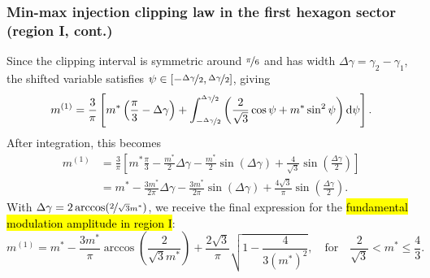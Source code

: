 \begin{frame}
    \frametitle{Min-max injection clipping law in the first hexagon sector (region I, cont.)}
    Since the clipping interval is symmetric around $\nicefrac{\pi}{6}$ and has width $\Delta\gamma = \gamma_2-\gamma_1$, the shifted variable satisfies $\psi \in [-\nicefrac{\Delta\gamma}{2},\nicefrac{\Delta\gamma}{2}]$, giving
    \begin{equation}
        m^{(1)} = \frac{3}{\pi}\left[m^*\left(\frac{\pi}{3}-\Delta\gamma\right) + \int_{-\nicefrac{\Delta\gamma}{2}}^{\nicefrac{\Delta\gamma}{2}}\left(\frac{2}{\sqrt{3}}\cos\psi + m^*\sin^2\psi\right)\mathrm{d}\psi\right].
    \end{equation}\pause
    After integration, this becomes
    \begin{equation}
        \begin{split}
            m^{(1)} & = \frac{3}{\pi}\left[m^*\frac{\pi}{3} - \frac{m^*}{2}\Delta\gamma - \frac{m^*}{2}\sin\!\left(\Delta\gamma\right) + \frac{4}{\sqrt{3}}\sin\!\left(\frac{\Delta\gamma}{2}\right)\right] \\
                    & = m^* - \frac{3m^*}{2\pi}\Delta\gamma - \frac{3m^*}{2\pi}\sin\!\left(\Delta\gamma\right) + \frac{4\sqrt{3}}{\pi}\sin\!\left(\frac{\Delta\gamma}{2}\right).
        \end{split}
    \end{equation}\pause
    With $\Delta\gamma = 2\arccos\!\left(\nicefrac{2}{\sqrt{3}m^*}\right)$, we receive the final expression for the \hl{fundamental modulation amplitude in region I}:
    \begin{equation}
        m^{(1)} = m^* - \frac{3m^*}{\pi}\arccos\!\left(\frac{2}{\sqrt{3}m^*}\right) + \frac{2\sqrt{3}}{\pi}\sqrt{1-\frac{4}{3(m^*)^2}}, \quad \text{for} \quad \frac{2}{\sqrt{3}} < m^* \le \frac{4}{3}.
    \end{equation}
\end{frame}

